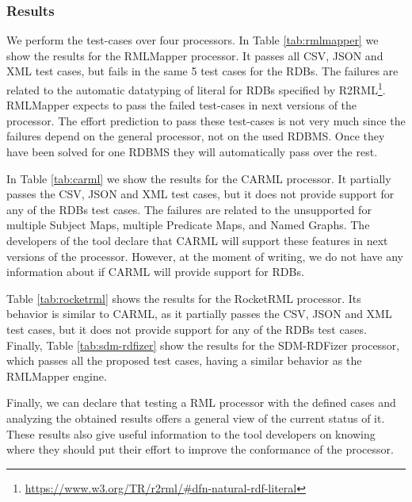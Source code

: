 \subsubsection{Results}
We perform the test-cases over four processors. In Table \ref{tab:rmlmapper} we show the results for the RMLMapper processor. It passes all CSV, JSON and XML test cases, but fails in the same 5 test cases for the RDBs. The failures are related to the automatic datatyping of literal for RDBs specified by R2RML\footnote{\url{https://www.w3.org/TR/r2rml/\#dfn-natural-rdf-literal}}. RMLMapper expects to pass the failed test-cases in next versions of the processor. The effort prediction to pass these test-cases is not very much since the failures depend on the general processor, not on the used RDBMS. Once they have been solved for one RDBMS they will automatically pass over the rest.

In Table \ref{tab:carml} we show the results for the CARML processor. It partially passes the CSV, JSON and XML test cases, but it does not provide support for any of the RDBs test cases. The failures are related to the unsupported for multiple Subject Maps, multiple Predicate Maps, and Named Graphs. The developers of the tool declare that CARML will support these features in next versions of the processor. However, at the moment of writing, we do not have any information about if CARML will provide support for RDBs.

Table \ref{tab:rocketrml} shows the results for the RocketRML processor. Its behavior is similar to CARML, as it partially passes the CSV, JSON and XML test cases, but it does not provide support for any of the RDBs test cases. Finally, Table \ref{tab:sdm-rdfizer} show the results for the SDM-RDFizer processor, which passes all the proposed test cases, having a similar behavior as the RMLMapper engine.

Finally, we can declare that testing a RML processor with the defined cases and analyzing the obtained results offers a general view of the current status of it. These results also give useful information to the tool developers on knowing where they should put their effort to improve the conformance of the processor.

